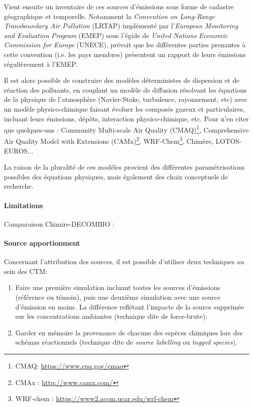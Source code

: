 Vient ensuite un inventaire de ces sources d'émissions sous forme de cadastre géographique
et temporelle. Notamment la \textit{Convention on Long-Range Transboundary Air
Pollution} (LRTAP) implémenté par l'\textit{European Monitoring and Evaluation Program}
(EMEP) sous l'égide de \textit{United Nations Economic Commission for Europe} (UNECE),
prévoit que les différentes parties prenantes à cette convention (i.e. les pays membres)
présentent un rapport de leurs émissions régulièrement à l'EMEP.

Il est alors possible de construire des modèles déterministes de dispersion et de
réaction des polluants, en couplant un modèle de diffusion résolvant les équations de la
physique de l'atmosphère (Navier-Stoke, turbulence, rayonnement, etc) avec un modèle
physico-chimique faisant évoluer les composés gazeux et particulaires, incluant leurs
émissions, dépôts, interaction physico-chimique, etc. Pour n'en citer que quelques-uns : 
Community Multi-scale Air Quality (CMAQ)\footnote{CMAQ: \url{https://www.epa.gov/cmaq}},
Comprehensive Air Quality Model with Extensions (CAMx)\footnote{CMAx : \url{http://www.camx.com/}},
WRF-Chem\footnote{WRF-chem : \url{https://www2.acom.ucar.edu/wrf-chem}},
Chimère,
LOTOS-EUROS...

La raison de la pluralité de ces modèles provient des différentes paramétrisations
possibles des équations physiques, mais également des choix conceptuels de recherche.

\paragraph{Limitations}%
\label{par:limitations}

Comparaison Chimire-DECOMBIO : \cite{bessagnetHigh2020}

\paragraph{Source apportionment}%
\label{par:source_apportionment}

Concernant l'attribution des sources, il est possible d'utiliser deux techniques au sein
des CTM:

\begin{enumerate}
    \item Faire une première simulation incluant toutes les sources d'émissions (référence
        ou témoin), puis une deuxième simulation avec une source d'émission en moins. La
        différence reflétant l'impacte de la source supprimée sur les concentrations
        ambiantes (technique dite de force-brute);
    \item Garder en mémoire la provenance de chacune des espèces chimiques lors des
        schémas réactionnels (technique dite de \textit{source labelling} ou \textit{tagged species}).
\end{enumerate}

